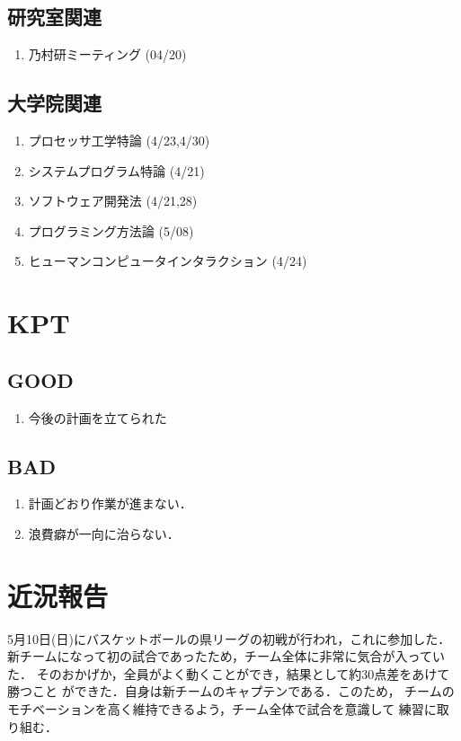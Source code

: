 \documentclass[fleqn, 14pt]{extarticlej}
\begin{document}
  \subsection{研究室関連}
  \begin{enumerate}
   \item 乃村研ミーティング
         \hfill
         (04/20)
  \end{enumerate}

  \subsection{大学院関連}
  \begin{enumerate}
    \item プロセッサ工学特論
    \hfill
    \label{enum-univ2}
    (4/23,4/30)
    \item システムプログラム特論
    \hfill
    \label{enum-univ2}
    (4/21)
    \item ソフトウェア開発法
    \hfill
    \label{enum-univ2}
    (4/21,28)
    \item プログラミング方法論
    \hfill
    \label{enum-univ2}
    (5/08)
    \item ヒューマンコンピュータインタラクション
    \hfill
    \label{enum-univ2}
    (4/24)


  \end{enumerate}

\section{KPT}
  \subsection{GOOD}
  \begin{enumerate}
   \item 今後の計画を立てられた
  \end{enumerate}

  \subsection{BAD}
  \begin{enumerate}
   \item 計画どおり作業が進まない．
   \item 浪費癖が一向に治らない．
  \end{enumerate}

\section{近況報告}
5月10日(日)にバスケットボールの県リーグの初戦が行われ，これに参加した．
新チームになって初の試合であったため，チーム全体に非常に気合が入っていた．
そのおかげか，全員がよく動くことができ，結果として約30点差をあけて勝つこと
ができた．自身は新チームのキャプテンである．このため，
チームのモチベーションを高く維持できるよう，チーム全体で試合を意識して
練習に取り組む．
\end{document}
